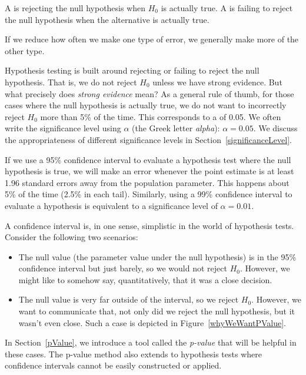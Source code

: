 A  is rejecting the null hypothesis when $H_0$ is actually true. A  is failing to reject the null hypothesis when the alternative is actually true.



If we reduce how often we make one type of error, we generally make more of the other type.

Hypothesis testing is built around rejecting or failing to reject the null hypothesis. That is, we do not reject $H_0$ unless we have strong evidence. But what precisely does \emph{strong evidence} mean? As a general rule of thumb, for those cases where the null hypothesis is actually true, we do not want to incorrectly reject $H_0$ more than 5\% of the time. This corresponds to a  of 0.05. We often write the significance level using $\alpha$ (the Greek letter \emph{alpha}): $\alpha = 0.05$. We discuss the appropriateness of different significance levels in Section~\ref{significanceLevel}.

If we use a 95\% confidence interval to evaluate a hypothesis test where the null hypothesis is true, we will make an error whenever the point estimate is at least 1.96 standard errors away from the population parameter. This happens about 5\% of the time (2.5\% in each tail). Similarly, using a 99\% confidence interval to evaluate a hypothesis is equivalent to a significance level of $\alpha = 0.01$.

A confidence interval is, in one sense, simplistic in the world of hypothesis tests. Consider the following two scenarios:
\begin{itemize}
\setlength{\itemsep}{0mm}
\item The null value (the parameter value under the null hypothesis) is in the 95\% confidence interval but just barely, so we would not reject $H_0$. However, we might like to somehow say, quantitatively, that it was a close decision.
\item The null value is very far outside of the interval, so we reject $H_0$. However, we want to communicate that, not only did we reject the null hypothesis, but it wasn't even close. Such a case is depicted in Figure~\ref{whyWeWantPValue}.
\end{itemize}
In Section~\ref{pValue}, we introduce a tool called the \emph{p-value} that will be helpful in these cases. The p-value method also extends to hypothesis tests where confidence intervals cannot be easily constructed or applied.


